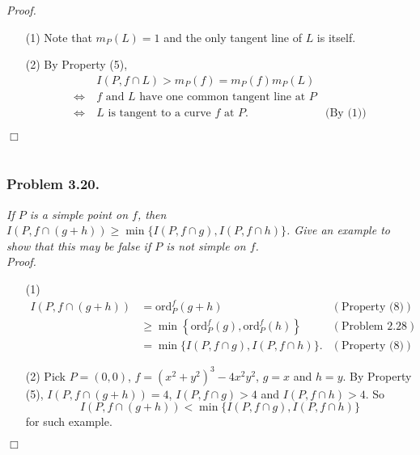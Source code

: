 \documentclass{article}
\begin{document}
\emph{Proof.}
\begin{enumerate}
\item[(1)]
  Note that $m_P(L) = 1$ and the only tangent line of $L$ is itself.

\item[(2)]
  By Property (5),
  \begin{align*}
    & \: I(P, f \cap L) > m_P(f) = m_P(f) m_P(L) \\
    \Longleftrightarrow & \:
      \text{$f$ and $L$ have one common tangent line at $P$} \\
    \Longleftrightarrow & \:
      \text{$L$ is tangent to a curve $f$ at $P$}.
      &\text{(By (1))}
  \end{align*}
\end{enumerate}
$\Box$ \\\\






\subsubsection*{Problem 3.20.}
\emph{If $P$ is a simple point on $f$,
then $I(P, f \cap (g+h)) \geq \min\{ I(P, f \cap g), I(P, f \cap h) \}$.
Give an example to show that this may be false if $P$ is not simple on $f$.} \\



\emph{Proof.}
\begin{enumerate}
\item[(1)]
  \begin{align*}
    I(P, f \cap (g+h))
    &= \mathrm{ord}_P^f(g+h)
      &(\text{Property (8)}) \\
    &\geq \min\left\{ \mathrm{ord}_P^f(g), \mathrm{ord}_P^f(h) \right\}
      &(\text{Problem 2.28}) \\
    &= \min\{ I(P, f \cap g), I(P, f \cap h) \}.
      &(\text{Property (8)})
  \end{align*}

\item[(2)]
  Pick $P = (0,0)$, $f = (x^2+y^2)^3 - 4x^2y^2$, $g = x$ and $h = y$.
  By Property (5),
  $I(P, f \cap (g+h)) = 4$, $I(P, f \cap g) > 4$ and $I(P, f \cap h) > 4$.
  So
  \[
    I(P, f \cap (g+h)) < \min\{ I(P, f \cap g), I(P, f \cap h) \}
  \]
  for such example.
\end{enumerate}
$\Box$ \\\\
\end{document}
